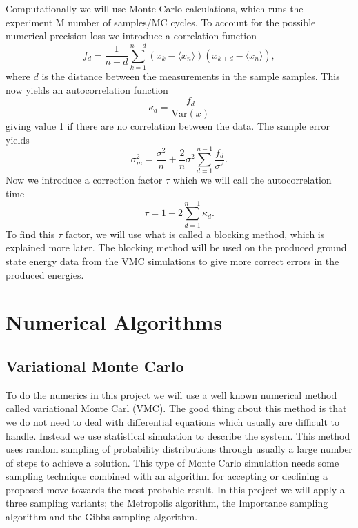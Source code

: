 \documentclass[12pt,a4paper,english]{article}
\begin{document}
Computationally we will use Monte-Carlo calculations, which runs the experiment M number of samples/MC cycles. To account for the possible numerical precision loss we introduce a correlation function 
\begin{equation}
\label{eq:stat_corr_func}
f_d=\frac{1}{n-d}\sum_{k=1}^{n-d}(x_k-\langle x_n\rangle)(x_{k+d}-\langle x_n\rangle),
\end{equation}
where $d$ is the distance between the measurements in the sample samples. This now yields an autocorrelation function
\begin{equation}
\label{eq:stat_autocorr}
\kappa_d=\frac{f_d}{\text{Var}(x)}
\end{equation}
giving value 1 if there are no correlation between the data. The sample error yields
\begin{equation*}
\sigma_m^2=\frac{\sigma^2}{n}+\frac{2}{n}\sigma^2\sum_{d=1}^{n-1}\frac{f_d}{\sigma^2}.
\end{equation*}
Now we introduce a correction factor $\tau$ which we will call the autocorrelation time
\begin{equation}
\label{eq:stat_autocorr_time}
\tau= 1+2\sum_{d=1}^{n-1}\kappa_d.
\end{equation}
To find this $\tau$ factor, we will use what is called a blocking method, which is explained more later. The blocking method will be used on the produced ground state energy data from the VMC simulations to give more correct errors in the produced energies.


\section{Numerical Algorithms}
\label{sect:Num_algos}
\subsection{Variational Monte Carlo}
\label{subsect:VMC}
To do the numerics in this project we will use a well known numerical method called variational Monte Carl (VMC). The good thing about this method is that we do not need to deal with differential equations which usually are difficult to handle. Instead we use statistical simulation to describe the system. This method uses random sampling of probability distributions through usually a large number of steps to achieve a solution. This type of Monte Carlo simulation needs some sampling technique combined with an algorithm for accepting or declining a proposed move towards the most probable result. In this project we will apply a three sampling variants; the Metropolis algorithm, the Importance sampling algorithm and the Gibbs sampling algorithm.
\end{document}

